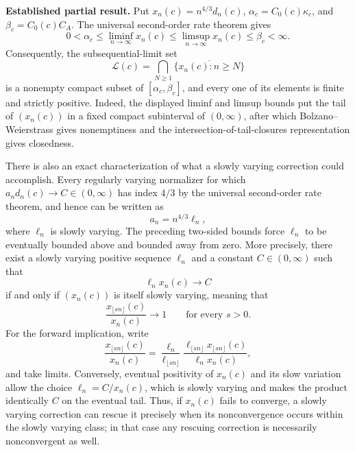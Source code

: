 \textbf{Established partial result.}
Put \(x_n(c)=n^{4/3}d_n(c)\), \(\alpha_c=C_0(c)\kappa_c\), and \(\beta_c=C_0(c)C_A\).  The universal second-order rate theorem gives
\[
 0<\alpha_c\leq\liminf_{n\to\infty}x_n(c)
 \leq\limsup_{n\to\infty}x_n(c)\leq\beta_c<\infty.
\]
Consequently, the subsequential-limit set
\[
 \mathcal L(c)=\bigcap_{N\geq1}
 \overline{\{x_n(c):n\geq N\}}
\]
is a nonempty compact subset of \([\alpha_c,\beta_c]\), and every one of its elements is finite and strictly positive.  Indeed, the displayed liminf and limsup bounds put the tail of \((x_n(c))\) in a fixed compact subinterval of \((0,\infty)\), after which Bolzano--Weierstrass gives nonemptiness and the intersection-of-tail-closures representation gives closedness.

There is also an exact characterization of what a slowly varying correction could accomplish.  Every regularly varying normalizer for which \(a_nd_n(c)\to C\in(0,\infty)\) has index \(4/3\) by the universal second-order rate theorem, and hence can be written as
\[
 a_n=n^{4/3}\ell_n,
\]
where \(\ell_n\) is slowly varying.  The preceding two-sided bounds force \(\ell_n\) to be eventually bounded above and bounded away from zero.  More precisely, there exist a slowly varying positive sequence \(\ell_n\) and a constant \(C\in(0,\infty)\) such that
\[
 \ell_nx_n(c)\longrightarrow C
\]
if and only if \((x_n(c))\) is itself slowly varying, meaning that
\[
 \frac{x_{\lfloor sn\rfloor}(c)}{x_n(c)}\longrightarrow1
 \qquad\text{for every }s>0.
\]
For the forward implication, write
\[
 \frac{x_{\lfloor sn\rfloor}(c)}{x_n(c)}
 =\frac{\ell_n}{\ell_{\lfloor sn\rfloor}}
 \frac{\ell_{\lfloor sn\rfloor}x_{\lfloor sn\rfloor}(c)}
      {\ell_nx_n(c)},
\]
and take limits.  Conversely, eventual positivity of \(x_n(c)\) and its slow variation allow the choice \(\ell_n=C/x_n(c)\), which is slowly varying and makes the product identically \(C\) on the eventual tail.  Thus, if \(x_n(c)\) fails to converge, a slowly varying correction can rescue it precisely when its nonconvergence occurs within the slowly varying class; in that case any rescuing correction is necessarily nonconvergent as well.

